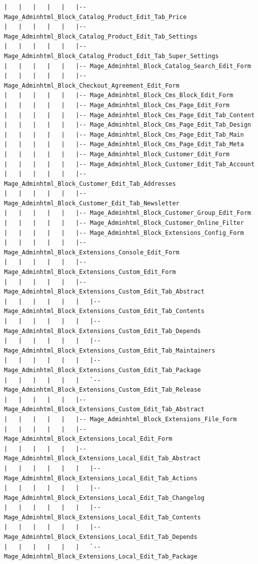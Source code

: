 \documentclass[oneside]{book}
\begin{document}
\begin{lstlisting}
|   |   |   |   |   |-- Mage_Adminhtml_Block_Catalog_Product_Edit_Tab_Price
|   |   |   |   |   |-- Mage_Adminhtml_Block_Catalog_Product_Edit_Tab_Settings
|   |   |   |   |   |-- Mage_Adminhtml_Block_Catalog_Product_Edit_Tab_Super_Settings
|   |   |   |   |   |-- Mage_Adminhtml_Block_Catalog_Search_Edit_Form
|   |   |   |   |   |-- Mage_Adminhtml_Block_Checkout_Agreement_Edit_Form
|   |   |   |   |   |-- Mage_Adminhtml_Block_Cms_Block_Edit_Form
|   |   |   |   |   |-- Mage_Adminhtml_Block_Cms_Page_Edit_Form
|   |   |   |   |   |-- Mage_Adminhtml_Block_Cms_Page_Edit_Tab_Content
|   |   |   |   |   |-- Mage_Adminhtml_Block_Cms_Page_Edit_Tab_Design
|   |   |   |   |   |-- Mage_Adminhtml_Block_Cms_Page_Edit_Tab_Main
|   |   |   |   |   |-- Mage_Adminhtml_Block_Cms_Page_Edit_Tab_Meta
|   |   |   |   |   |-- Mage_Adminhtml_Block_Customer_Edit_Form
|   |   |   |   |   |-- Mage_Adminhtml_Block_Customer_Edit_Tab_Account
|   |   |   |   |   |-- Mage_Adminhtml_Block_Customer_Edit_Tab_Addresses
|   |   |   |   |   |-- Mage_Adminhtml_Block_Customer_Edit_Tab_Newsletter
|   |   |   |   |   |-- Mage_Adminhtml_Block_Customer_Group_Edit_Form
|   |   |   |   |   |-- Mage_Adminhtml_Block_Customer_Online_Filter
|   |   |   |   |   |-- Mage_Adminhtml_Block_Extensions_Config_Form
|   |   |   |   |   |-- Mage_Adminhtml_Block_Extensions_Console_Edit_Form
|   |   |   |   |   |-- Mage_Adminhtml_Block_Extensions_Custom_Edit_Form
|   |   |   |   |   |-- Mage_Adminhtml_Block_Extensions_Custom_Edit_Tab_Abstract
|   |   |   |   |   |   |-- Mage_Adminhtml_Block_Extensions_Custom_Edit_Tab_Contents
|   |   |   |   |   |   |-- Mage_Adminhtml_Block_Extensions_Custom_Edit_Tab_Depends
|   |   |   |   |   |   |-- Mage_Adminhtml_Block_Extensions_Custom_Edit_Tab_Maintainers
|   |   |   |   |   |   |-- Mage_Adminhtml_Block_Extensions_Custom_Edit_Tab_Package
|   |   |   |   |   |   `-- Mage_Adminhtml_Block_Extensions_Custom_Edit_Tab_Release
|   |   |   |   |   |-- Mage_Adminhtml_Block_Extensions_Custom_Edit_Tab_Abstract
|   |   |   |   |   |-- Mage_Adminhtml_Block_Extensions_File_Form
|   |   |   |   |   |-- Mage_Adminhtml_Block_Extensions_Local_Edit_Form
|   |   |   |   |   |-- Mage_Adminhtml_Block_Extensions_Local_Edit_Tab_Abstract
|   |   |   |   |   |   |-- Mage_Adminhtml_Block_Extensions_Local_Edit_Tab_Actions
|   |   |   |   |   |   |-- Mage_Adminhtml_Block_Extensions_Local_Edit_Tab_Changelog
|   |   |   |   |   |   |-- Mage_Adminhtml_Block_Extensions_Local_Edit_Tab_Contents
|   |   |   |   |   |   |-- Mage_Adminhtml_Block_Extensions_Local_Edit_Tab_Depends
|   |   |   |   |   |   `-- Mage_Adminhtml_Block_Extensions_Local_Edit_Tab_Package

\end{lstlisting}
\end{document}
